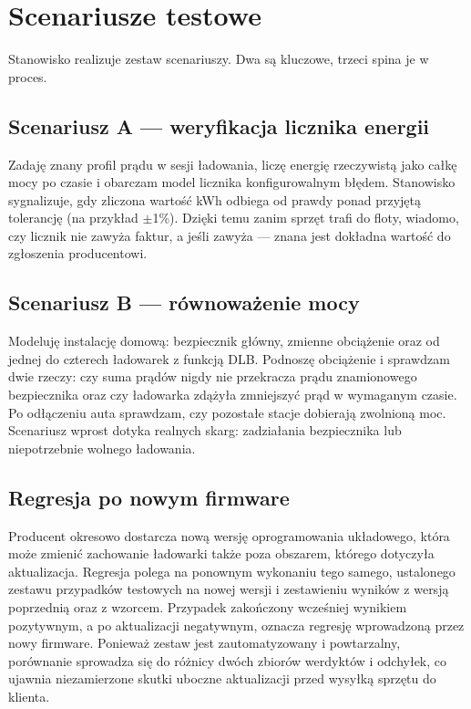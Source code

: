 \documentclass[11pt]{article}
\begin{document}
\section{Scenariusze testowe}

Stanowisko realizuje zestaw scenariuszy. Dwa są kluczowe, trzeci spina je w proces.

\subsection{Scenariusz A --- weryfikacja licznika energii}

Zadaję znany profil prądu w sesji ładowania, liczę energię rzeczywistą jako całkę mocy po czasie i obarczam model licznika konfigurowalnym błędem. Stanowisko sygnalizuje, gdy zliczona wartość kWh odbiega od prawdy ponad przyjętą tolerancję (na przykład $\pm$1\%). Dzięki temu zanim sprzęt trafi do floty, wiadomo, czy licznik nie zawyża faktur, a jeśli zawyża --- znana jest dokładna wartość do zgłoszenia producentowi.

\subsection{Scenariusz B --- równoważenie mocy}

Modeluję instalację domową: bezpiecznik główny, zmienne obciążenie oraz od jednej do czterech ładowarek z funkcją DLB. Podnoszę obciążenie i sprawdzam dwie rzeczy: czy suma prądów nigdy nie przekracza prądu znamionowego bezpiecznika oraz czy ładowarka zdążyła zmniejszyć prąd w wymaganym czasie. Po odłączeniu auta sprawdzam, czy pozostałe stacje dobierają zwolnioną moc. Scenariusz wprost dotyka realnych skarg: zadziałania bezpiecznika lub niepotrzebnie wolnego ładowania.

\subsection{Regresja po nowym firmware}

Producent okresowo dostarcza nową wersję oprogramowania układowego, która może zmienić zachowanie ładowarki także poza obszarem, którego dotyczyła aktualizacja. Regresja polega na ponownym wykonaniu tego samego, ustalonego zestawu przypadków testowych na nowej wersji i zestawieniu wyników z wersją poprzednią oraz z wzorcem. Przypadek zakończony wcześniej wynikiem pozytywnym, a po aktualizacji negatywnym, oznacza regresję wprowadzoną przez nowy firmware. Ponieważ zestaw jest zautomatyzowany i powtarzalny, porównanie sprowadza się do różnicy dwóch zbiorów werdyktów i odchyłek, co ujawnia niezamierzone skutki uboczne aktualizacji przed wysyłką sprzętu do klienta.
\end{document}
